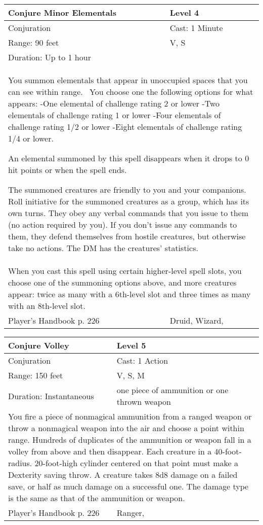 \documentclass[11pt]{report}
\begin{document}
\begin{table}[H]
	\begin{tabular}{||p{6cm}|p{6cm}||}
		\hline\hline
		\bf{Conjure Minor Elementals} & Level 4\\ \hline
		Conjuration & Cast: 1 Minute\\ \hline
		Range: 90 feet & V, S\\ \hline
		Duration: Up to 1 hour & \\ \hline
		\multicolumn{2}{||p{12cm}||}{You summon elementals that appear in unoccupied spaces that you can see within range.
 You choose one the following options for what appears: 
-One elemental of challenge rating 2 or lower 
-Two elementals of challenge rating 1 or lower 
-Four elementals of challenge rating 1/2 or lower 
-Eight elementals of challenge rating 1/4 or lower. 

An elemental summoned by this spell disappears when it drops to 0 hit points or when the spell ends. 

The summoned creatures are friendly to you and your companions. Roll initiative for the summoned creatures as a group, which has its own turns. They obey any verbal commands that you issue to them (no action required by you). If you don’t issue any commands to them, they defend themselves from hostile creatures, but otherwise take no actions. 
The DM has the creatures’ statistics.}\\ \hline
		\multicolumn{2}{||p{12cm}||}{When you cast this spell using certain higher-level spell slots, you choose one of the summoning options above, and more creatures appear: twice as many with a 6th-level slot and three times as many with an 8th-level slot.}\\ \hline
Player's Handbook p. 226 & Druid, Wizard, \\ \hline\hline
	\end{tabular}
\end{table}

\begin{table}[H]
	\begin{tabular}{||p{6cm}|p{6cm}||}
		\hline\hline
		\bf{Conjure Volley} & Level 5\\ \hline
		Conjuration & Cast: 1 Action\\ \hline
		Range: 150 feet & V, S, M \\ \hline
		Duration: Instantaneous & one piece of ammunition or one thrown weapon\\ \hline
		\multicolumn{2}{||p{12cm}||}{You fire a piece of nonmagical ammunition from a ranged weapon or throw a nonmagical weapon into the air and choose a point within range. 
Hundreds of duplicates of the ammunition or weapon fall in a volley from above and then disappear. Each creature in a 40-foot-radius. 20-foot-high cylinder centered on that point must make a Dexterity saving throw. A creature takes 8d8 damage on a failed save, or half as much damage on a successful one. The damage type is the same as that of the ammunition or weapon.}\\ \hline
Player's Handbook p. 226 & Ranger, \\ \hline\hline
	\end{tabular}
\end{table}
\end{document}
